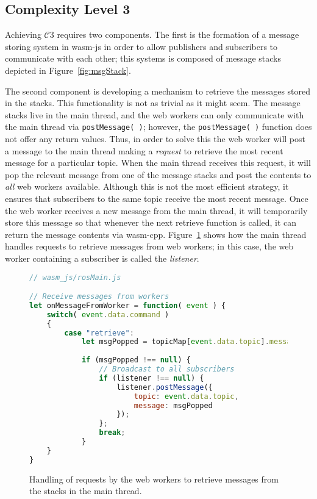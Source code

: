         \subsection{Complexity Level 3}\label{sec:topicmap}

        Achieving $\mathcal{C}3$ requires two components. The first is the formation of a message storing system in \textsf{wasm-js} in order to allow publishers and subscribers to communicate with each other; this systems is composed of message stacks depicted in Figure~\ref{fig:msgStack}. 
        
        The second component is developing a mechanism to retrieve the messages stored in the stacks. This functionality is not as trivial as it might seem. The message stacks live in the main thread, and the web workers can only communicate with the main thread via \texttt{postMessage( )}; however, the \texttt{postMessage( )} function does not offer any return values. Thus, in order to solve this the web worker will post a message to the main thread making a \textit{request} to retrieve the most recent message for a particular topic. When the main thread receives this request, it will pop the relevant message from one of the message stacks and post the contents to \textit{all} web workers available. Although this is not the most efficient strategy, it ensures that subscribers to the same topic receive the most recent message. Once the web worker receives a new message from the main thread, it will temporarily store this message so that whenever the next retrieve function is called, it can return the message contents via \textsf{wasm-cpp}. Figure~\ref{fig:retrieval} shows how the main thread handles requests to retrieve messages from web workers; in this case, the web worker containing a subscriber is called the \textit{listener}.

        \begin{figure}[htbp]
            \begin{lstlisting}[language=javascript]
// wasm_js/rosMain.js

// Receive messages from workers
let onMessageFromWorker = function( event ) {
    switch( event.data.command )
    {
        case "retrieve":
            let msgPopped = topicMap[event.data.topic].messages.pop();
            
            if (msgPopped !== null) {
                // Broadcast to all subscribers
                if (listener !== null) { 
                    listener.postMessage({
                        topic: event.data.topic,
                        message: msgPopped
                    }); 
                };         
                break;
            }
    }
}
\end{lstlisting}
            \caption{Handling of requests by the web workers to retrieve messages from the stacks in the main thread.}
            \label{fig:retrieval}
        \end{figure}


